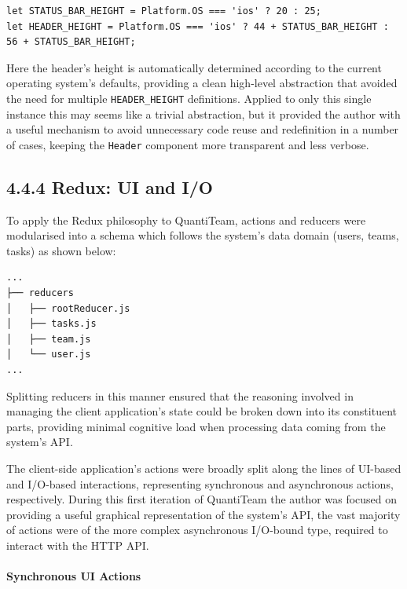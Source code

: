 \begin{verbatim}
let STATUS_BAR_HEIGHT = Platform.OS === 'ios' ? 20 : 25;
let HEADER_HEIGHT = Platform.OS === 'ios' ? 44 + STATUS_BAR_HEIGHT : 56 + STATUS_BAR_HEIGHT;
\end{verbatim}

Here the header's height is automatically determined according to the
current operating system's defaults, providing a clean high-level
abstraction that avoided the need for multiple \texttt{HEADER\_HEIGHT}
definitions. Applied to only this single instance this may seems like a
trivial abstraction, but it provided the author with a useful mechanism
to avoid unnecessary code reuse and redefinition in a number of cases,
keeping the \texttt{Header} component more transparent and less verbose.

\subsection{4.4.4 Redux: UI and I/O}\label{redux-ui-and-io}

To apply the Redux philosophy to QuantiTeam, actions and reducers were
modularised into a schema which follows the system's data domain (users,
teams, tasks) as shown below:

\begin{verbatim}
...
├── reducers
│   ├── rootReducer.js
│   ├── tasks.js
│   ├── team.js
│   └── user.js
...
\end{verbatim}

Splitting reducers in this manner ensured that the reasoning involved in
managing the client application's state could be broken down into its
constituent parts, providing minimal cognitive load when processing data
coming from the system's API.

The client-side application's actions were broadly split along the lines
of UI-based and I/O-based interactions, representing synchronous and
asynchronous actions, respectively. During this first iteration of
QuantiTeam the author was focused on providing a useful graphical
representation of the system's API, the vast majority of actions were of
the more complex asynchronous I/O-bound type, required to interact with
the HTTP API.

\paragraph{Synchronous UI Actions}\label{synchronous-ui-actions}

